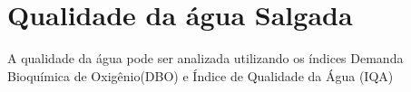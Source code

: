 \section{Qualidade da água Salgada}
A qualidade da água pode ser analizada utilizando os índices Demanda Bioquímica de Oxigênio(DBO) e Índice de Qualidade da Água (IQA)